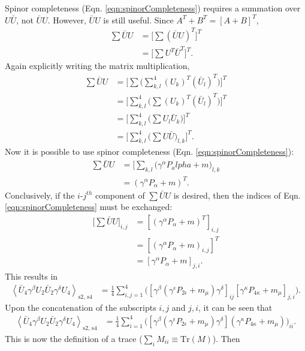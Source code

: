 Spinor completeness (Eqn. \ref{eqn:spinorCompleteness}) requires a summation over $U\bar{U}$, not $\bar{U}U$. However, $\bar{U}U$ is still useful. Since $A^T+B^T=[A+B]^T$,
\begin{align*}
\sum \bar{U}U 
&= \Big[\sum (\bar{U}U)^T\Big]^T\\
&=\Big[\sum U^T \bar{U}^T\Big]^T.
\end{align*}
Again explicitly writing the matrix multiplication,
\begin{align*}
\sum \bar{U}U 
&=\Big[\sum\Big(\sum_{k,l} ^4 (U_k)^T(\bar{U}_l)^T\Big)\Big]^T\\
&=\Big[\sum_{k,l} ^4 \Big(\sum (U_k)^T (\bar{U}_l)^T \Big)\Big]^T\\
&=\Big[\sum_{k,l}^4\Big(\sum U_l \bar{U}_k\Big)\Big]^T\\
&=\Big[\sum_{k,l}^4\Big(\sum U\bar{U})_{l,k}\Big]^T.
\end{align*}
Now it is possible to use spinor completeness (Eqn. \ref{eqn:spinorCompleteness}):
\begin{align*}
\sum \bar{U}U 
&=\Big[\sum_{k,l}\big(\gamma^\alpha P_alpha + m\big) _{l,k}\\
&=(\gamma^\alpha P_\alpha + m)^T.
\end{align*}
Conclusively, if the $i$-$j^{th}$ component of $\sum \bar{U}U$ is desired, then the indices of Eqn. \ref{eqn:spinorCompleteness} must be exchanged:
\begin{align*}
\Big[\sum\bar{U} U\Big]_{i,j}
&=[(\gamma^\alpha P_\alpha + m)^T]_{i,j}\\
&=[(\gamma^\alpha P_\alpha + m)_{i,j}]^T\\
&=[\gamma^\alpha P_\alpha + m]_{j,i}.
\end{align*}
This results in
\begin{align*}
\left< \bar{U}_4 \gamma^\beta U_2 \bar{U}_2 \gamma^\delta U_4 \right> _\text{s2, s4}
&=\frac{1}{4}\sum_{i,j=1} ^4 \Big([\gamma^\beta(\gamma^\epsilon P_{2\epsilon}+m_\mu)\gamma^\delta]_{ij} [\gamma^\kappa P_{4\kappa}+m_\mu]_{j,i} \Big).
\end{align*}
Upon the concatenation of the subscripts $i,j$ and $j,i$, it can be seen that
\begin{align*}
\left< \bar{U}_4 \gamma^\beta U_2 \bar{U}_2 \gamma^\delta U_4 \right> _\text{s2, s4}
&=\frac{1}{4}\sum_{i=1} ^4 \Big([\gamma^\beta(\gamma^\epsilon P_{2\epsilon}+m_\mu)\gamma^\delta] (\gamma^\kappa P_{4\kappa}+m_\mu) \Big)_{ii}.
\end{align*}
This is now the definition of a trace ($\sum_i M_{ii} \equiv \text{Tr} (M)$). Then

